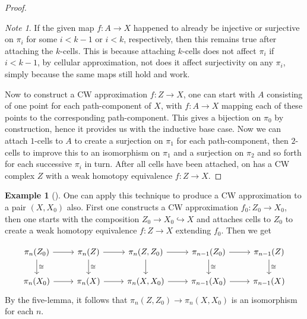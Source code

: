 \documentclass[reqno]{amsart}
\theoremstyle{definition}
\newtheorem{example}[theorem]{Example}
\theoremstyle{remark}
\newtheorem*{note}{Note}
\begin{document}
\begin{proof}
     \begin{note}
         If the given map $f \colon A \to X$ happened
         to already be injective or surjective
         on $\pi_i$ for some $i < k-1$ or
         $i < k$, respectively, then this remains
         true after attaching the $k$-cells.
         This is because attaching $k$-cells does
         not affect $\pi_i$ if $i < k-1$, by
         cellular approximation, not does
         it affect surjectivity on
         any $\pi_i$, simply because the same maps
         still hold and work.
     \end{note}

     Now to construct a CW approximation $f \colon Z \to 
     X$, one can start with $A$ consisting of one point for
     each path-component of $X$, with
     $f \colon A \to X$ mapping each of these points
     to the corresponding path-component.
     This gives a bijection on $\pi_0$ by construction, hence
     it provides us with the inductive base case.
     Now we can attach $1$-cells to $A$ to create
     a surjection on $\pi_1$ for each path-component, then
     $2$-cells to improve this to an isomorphism on
     $\pi_1$ and a surjection on $\pi_2$ and so forth
     for each successive $\pi_i$ in turn. After all cells
     have been attached, on has a CW complex $Z$ with
     a weak homotopy equivalence $f \colon Z \to X$.
\end{proof}


\begin{example}[]
    One can apply this technique to produce a CW approximation
    to a pair $(X,X_0)$ also. First one constructs
    a CW approximation $f_0 \colon Z_0 \to X_0$, then
    one starts with the composition
    $Z_0 \to X_0 \hookrightarrow X$ and attaches
    cells to $Z_0$ to create a weak homotopy equivalence
    $f \colon Z \to X$ extending $f_0$.
    Then we get

    \begin{equation*}
    \begin{tikzcd}
        \pi_n(Z_0) \ar[r] \ar[d, "\cong"] & \pi_n (Z) \ar[r] \ar[d,
        "\cong"] & 
        \pi_n (Z, Z_0) \ar[r] \ar[d] &
        \pi_{n-1} (Z_0) \ar[r] 
        \ar[d, "\cong"]&
        \pi_{n-1} (Z) \ar[d, "\cong"] \\
        \pi_n (X_0) \ar[r] & \pi_n(X) \ar[r] & \pi_n (X,X_0) \ar[r] &
        \pi_{n-1} (X_0) \ar[r] & \pi_{n-1}(X)
    \end{tikzcd}
    \end{equation*}
    By the five-lemma, it follows that
    $\pi_n \left( Z,Z_0 \right) \to 
    \pi_n \left( X,X_0 \right) $ is an isomorphism
    for each $n$.
\end{example}
\end{document}
